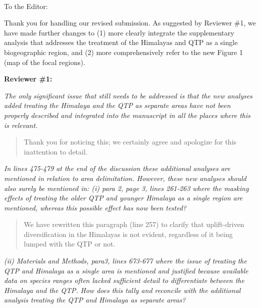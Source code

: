 \documentclass[11pt]{letter}
\begin{document}
\raggedright{}


\begin{letter}{ \\

}
\address{Integrative Research Center\\
  The Field Museum\\
  1400 South Lake Shore Drive\\
  Chicago, IL  60605-2496\\
  USA}

\opening{To the Editor:}

Thank you for handling our revised submission. As suggested by
Reviewer \#1, we have made further changes to (1) more clearly
integrate the supplementary analysis that addresses the treatment of
the Himalayas and QTP as a single biogeographic region, and (2) more
comprehensively refer to the new Figure 1 (map of the focal regions).

\textbf{Reviewer \#1:}

\textit{The only significant issue that still needs to be addressed is
  that the new analyses added treating the Himalaya and the QTP as
  separate areas have not been properly described and integrated into
  the manuscript in all the places where this is relevant.}

\begin{quote}
  Thank you for noticing this; we certainly agree and apologize for
  this inattention to detail.
\end{quote}

\textit{ In lines 475-479 at the end of the discussion these
  additional analyses are mentioned in relation to area
  delimitation. However, these new analyses should also surely be
  mentioned in: (i) para 2, page 3, lines 261-263 where the masking
  effects of treating the older QTP and younger Himalaya as a single
  region are mentioned, whereas this possible effect has now been
  tested?}

\begin{quote}
  We have rewritten this paragraph (line 257) to clarify that
  uplift-driven diversification in the Himalayas is not evident,
  regardless of it being lumped with the QTP or not.
\end{quote}

\textit{(ii) Materials and Methods, para3, lines 673-677 where the
  issue of treating the QTP and Himalaya as a single area is mentioned
  and justified because available data on species ranges often lacked
  sufficient detail to differentiate between the Himalaya and the
  QTP. How does this tally and reconcile with the additional analysis
  treating the QTP and Himalaya as separate areas?}


\end{letter}
\end{document}
